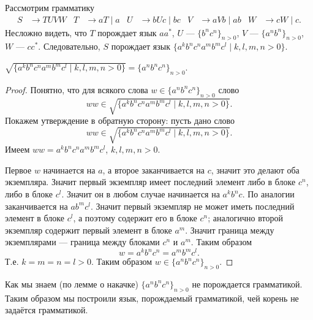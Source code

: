 \documentclass[12pt,a4paper]{article}
\begin{document}
    \begin{problem}{7}
        Рассмотрим грамматику
        \begin{align*}
            S &\to TUVW&
            T &\to aT \mid a&
            U &\to bUc \mid bc&
            V &\to aVb \mid ab&
            W &\to cW \mid c.
        \end{align*}
        Несложно видеть, что $T$ порождает язык $aa^*$, $U$ --- $\{b^nc^n\}_{n > 0}$, $V$ --- $\{a^nb^n\}_{n > 0}$, $W$ --- $cc^*$. Следовательно, $S$ порождает язык $\{a^k b^n c^n a^m b^m c^l \mid k, l, m, n > 0\}$.

        \begin{lemma}
            $\sqrt{\{a^k b^n c^n a^m b^m c^l \mid k, l, m, n > 0\}} = \{a^n b^n c^n\}_{n > 0}$.
        \end{lemma}

        \begin{proof}
            Понятно, что для всякого слова $w \in \{a^n b^n c^n\}_{n > 0}$ слово
            \[ww \in \sqrt{\{a^k b^n c^n a^m b^m c^l \mid k, l, m, n > 0\}}.\]
            Покажем утверждение в обратную сторону: пусть дано слово
            \[ww \in \sqrt{\{a^k b^n c^n a^m b^m c^l \mid k, l, m, n > 0\}}.\]
            Имеем $ww = a^k b^n c^n a^m b^m c^l$, $k, l, m, n > 0$.
            
            Первое $w$ начинается на $a$, а второе заканчивается на $c$, значит это делают оба экземпляра. Значит первый экземпляр имеет последний элемент либо в блоке $c^n$, либо в блоке $c^l$. Значит он в любом случае начинается на $a^k b^n c$. По аналогии заканчивается на $a b^m c^l$. Значит первый экземпляр не может иметь последний элемент в блоке $c^l$, а поэтому содержит его в блоке $c^n$; аналогично второй экземпляр содержит первый элемент в блоке $a^m$. Значит граница между экземплярами --- граница между блоками $c^n$ и $a^m$. Таким образом
            \[w = a^k b^n c^n = a^m b^m c^l.\]
            Т.е. $k = m = n = l > 0$. Таким образом $w \in \{a^n b^n c^n\}_{n > 0}$.
        \end{proof}

        Как мы знаем (по лемме о накачке) $\{a^n b^n c^n\}_{n > 0}$ не порождается грамматикой. Таким образом мы построили язык, порождаемый грамматикой, чей корень не задаётся грамматикой.
    \end{problem}
\end{document}
